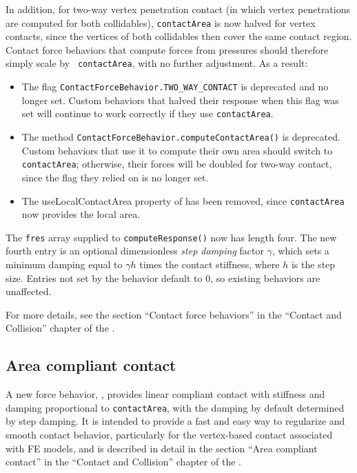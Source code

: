 \documentclass{article}
\begin{document}
In addition, for two-way vertex penetration contact (in which vertex
penetrations are computed for both collidables), {\tt contactArea} is
now halved for vertex contacts, since the vertices of both collidables
then cover the same contact region. Contact force behaviors that compute
forces from pressures should therefore simply scale by {\tt
contactArea}, with no further adjustment. As a result:

\begin{itemize}

\item The flag {\tt ContactForceBehavior.TWO\_WAY\_CONTACT} is
deprecated and no longer set. Custom behaviors that halved their
response when this flag was set will continue to work correctly if they
use {\tt contactArea}.

\item The method {\tt ContactForceBehavior.computeContactArea()} is
deprecated. Custom behaviors that use it to compute their own area
should switch to {\tt contactArea}; otherwise, their forces will be
doubled for two-way contact, since the flag they relied on is no longer
set.

\item The {\sf useLocalContactArea} property of
 has been removed, since
{\tt contactArea} now provides the local area.

\end{itemize}

The {\tt fres} array supplied to {\tt computeResponse()} now has
length four. The new fourth entry is an optional dimensionless {\it
step damping} factor $\gamma$, which sets a minimum damping equal to
$\gamma h$ times the contact stiffness, where $h$ is the step size.
Entries not set by the behavior default to 0, so existing behaviors
are unaffected.

For more details, see the section ``Contact force behaviors'' in the ``Contact
and Collision'' chapter of the .

\subsection{Area compliant contact}

A new force behavior, , provides linear
compliant contact with stiffness and damping proportional to {\tt contactArea},
with the damping by default determined by step damping. It is intended to
provide a fast and easy way to regularize and smooth contact behavior,
particularly for the vertex-based contact associated with FE models, and is
described in detail in the section ``Area compliant contact'' in the ``Contact
and Collision'' chapter of the .
\end{document}
